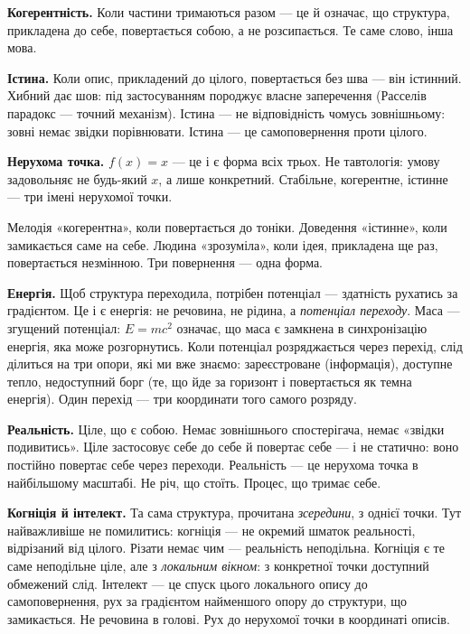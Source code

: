 \documentclass[12pt, a4paper, openany]{book}
\begin{document}
\textbf{Когерентність.} Коли частини тримаються разом --- це й означає, що структура, прикладена до себе, повертається собою, а не розсипається. Те саме слово, інша мова.

\textbf{Істина.} Коли опис, прикладений до цілого, повертається без шва --- він істинний. Хибний дає шов: під застосуванням породжує власне заперечення (Расселів парадокс --- точний механізм). Істина --- не відповідність чомусь зовнішньому: зовні немає звідки порівнювати. Істина --- це самоповернення проти цілого.

\textbf{Нерухома точка.} $f(x)=x$ --- це і є форма всіх трьох. Не тавтологія: умову задовольняє не будь-який $x$, а лише конкретний. Стабільне, когерентне, істинне --- три імені нерухомої точки.

\begin{analogybox}
Мелодія «когерентна», коли повертається до тоніки. Доведення «істинне», коли замикається саме на себе. Людина «зрозуміла», коли ідея, прикладена ще раз, повертається незмінною. Три повернення --- одна форма.
\end{analogybox}

\textbf{Енергія.} Щоб структура переходила, потрібен потенціал --- здатність рухатись за градієнтом. Це і є енергія: не речовина, не рідина, а \emph{потенціал переходу}. Маса --- згущений потенціал: $E=mc^2$ означає, що маса є замкнена в синхронізацію енергія, яка може розгорнутись. Коли потенціал розряджається через перехід, слід ділиться на три опори, які ми вже знаємо: зареєстроване (інформація), доступне тепло, недоступний борг (те, що йде за горизонт і повертається як темна енергія). Один перехід --- три координати того самого розряду.

\textbf{Реальність.} Ціле, що є собою. Немає зовнішнього спостерігача, немає «звідки подивитись». Ціле застосовує себе до себе й повертає себе --- і не статично: воно постійно повертає себе через переходи. Реальність --- це нерухома точка в найбільшому масштабі. Не річ, що стоїть. Процес, що тримає себе.

\textbf{Когніція й інтелект.} Та сама структура, прочитана \emph{зсередини}, з однієї точки. Тут найважливіше не помилитись: когніція --- не окремий шматок реальності, відрізаний від цілого. Різати немає чим --- реальність неподільна. Когніція є те саме неподільне ціле, але з \emph{локальним вікном}: з конкретної точки доступний обмежений слід. Інтелект --- це спуск цього локального опису до самоповернення, рух за градієнтом найменшого опору до структури, що замикається. Не речовина в голові. Рух до нерухомої точки в координаті описів.
\end{document}
